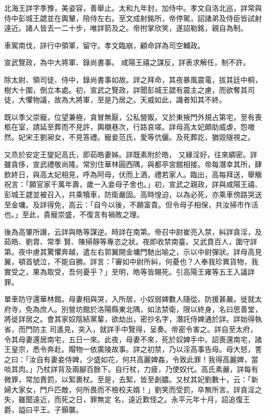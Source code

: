 \begin{pinyinscope}
 北海王詳字季豫，美姿容，善舉止。太和九年封，加侍中。孝文自洛北巡，詳常與侍中彭城王勰並在輿輦，陪侍左右。至文成射銘所，帝停駕，詔諸弟及侍臣皆試射遠近。諸人皆去一二十步，唯詳箭及之。帝拊掌欣笑，遂詔勒銘，親自為制。



 車駕南伐，詳行中領軍，留守。孝文臨崩，顧命詳為司空輔政。



 宣武覽政，為中大將軍、錄尚書事。
 咸陽王禧之謀反，詳表求解任，制不許。



 除太尉、領司徒、侍中，錄尚書事如故。詳之拜命，其夜暴風震電，拔其廷中桐，樹大十圍，倒立本處。初，宣武之覽政，詳聞彭城王勰有震主之慮，而欲奪其司徒，大懼物議，故為大將軍，至是乃居之。天威如此，識者知其不終。



 既以季父崇寵，位望兼極，貪冒無厭，公私營販。又於東掖門外規占第宅，至有喪柩在室，請延至葬而不見許，輿櫬巷次，行路哀嗟。詳母高太妃頗助威虐，怨嗷然。妃宋王劉昶女，不見答禮。寵妾范氏，愛等伉儷。及死葬訖，猶毀隧視之。



 又烝於安定王燮妃高氏，即茹皓妻姊。詳既素附於皓，
 又緣淫好，往來綢密。詳雖貪侈，宣武禮敬尚隆。常別住華林圓西隅，與都亭宮館相接。帝每潛幸其所，肆飲終日，與高太妃相見，呼為阿母，伏而上酒，禮若家人。臨出，高每拜送，舉觴祝言：「願官家千萬年壽，歲一入妾母子舍也。」初，宣武之親政，詳與咸陽王禧、彭城王勰並被召入，共乘犢車，防衛嚴固。高時惶迫，以為必死，亦乘車傍路哭送至金墉。及詳得免，高云：「自今以後，不願富貴。但令母子相保，共汝掃市作活也。」至此，貴寵崇盛，不復言有禍敗之理。



 後為高肇所譖，云詳與皓等謀逆。時詳在南第。帝召中尉崔亮入禁，糾詳貪淫，及茹皓、劉胄、常季
 賢、陳掃靜等專恣之狀。夜即收禁南臺。又武賁百人，圍守詳第。夜中慮其驚懼奔越，遣左右郭翼開金墉門馳出喻之，示以中尉彈狀。詳母高見翼，頓首號泣，不能自勝。詳言：「審如中尉所糾，何憂也？人奉我珍異貨物，我實受之，果為取受，吾何憂乎？」至明，皓等皆賜死。引高陽王雍等五王入議詳罪。



 單車防守還華林館。母妻相與哭，入所居，小奴弱婢數人隨從。防援甚嚴。徙就太府寺，免為庶人。別營坊館於洛陽縣東北隅，如法禁衛，限以終身，名曰思善堂，將徙詳居之。會其家奴陰結黨輩，欲劫出，密抄名字，潛託侍婢通於詳。詳始得執省，而門防主
 司遙見，突入，就詳手中覽得，呈奏。帝密令害之。詳自至太府，令其母妻還居南宅，五日一來。此夜，母妻不來，死於奴婢手中。詔喪還南宅，諸王皇宗，悉令奔赴。賵物一依廣陵故事。詳之初禁，乃以淫高事告母。母大怒，詈之曰：「汝自有妻妾侍婢，少盛如花，何共高麗婢姦，令致此罪！我得高麗婢，當啖其肉。」乃杖詳背及兩腳百餘下。自行杖，力疲，乃使奴代。高氏素嚴，詳每有微罪，常加責罰，以絮裹杖。至是，去絮，皆至創膿。又杖其妃劉數十，云：「新婦大家女，門戶匹敵，何所畏而不檢校夫婿！」劉笑而受罰，卒無所言。詳貪淫之失，雖聞遠近，而死之日，罪無定
 名，遠近歎怪之。永平元年十月，詔追復王爵，謚曰平王。子顥襲。




\end{pinyinscope}

